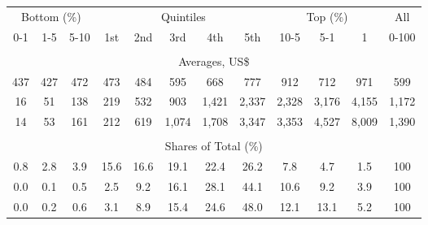 \begin{tabular}{c c c| c c c c c| c c c| c}
\toprule
\multicolumn{3}{c|}{Bottom (\%)} & \multicolumn{5}{c|}{Quintiles} & \multicolumn{3}{c|}{Top (\%)} & All  \\
0-1 & 1-5 & 5-10 &  1st & 2nd & 3rd & 4th & 5th & 10-5 & 5-1 & 1 & 0-100 \\
\midrule \\
\multicolumn{12}{c}{Averages, US\$} \\
\midrule
437  & 427  & 472  & 473  & 484  & 595  & 668  & 777  & 912  & 712  & 971  & 599 \\
16 & 51 & 138 & 219 & 532 & 903 & 1,421 & 2,337 & 2,328 & 3,176 & 4,155 & 1,172 \\
14 & 53 & 161 & 212 & 619 & 1,074 & 1,708 & 3,347 & 3,353 & 4,527 & 8,009 & 1,390 \\
\midrule \\
\multicolumn{12}{c}{Shares of Total (\%)} \\
\midrule
0.8   & 2.8   & 3.9   & 15.6   & 16.6   & 19.1   & 22.4   & 26.2   & 7.8   & 4.7   & 1.5   & 100 \\
0.0  & 0.1  & 0.5  & 2.5  & 9.2  & 16.1  & 28.1  & 44.1  & 10.6  & 9.2  & 3.9  & 100 \\
0.0  & 0.2  & 0.6  & 3.1  & 8.9  & 15.4  & 24.6  & 48.0  & 12.1  & 13.1  & 5.2  & 100 \\
\bottomrule
\end{tabular}